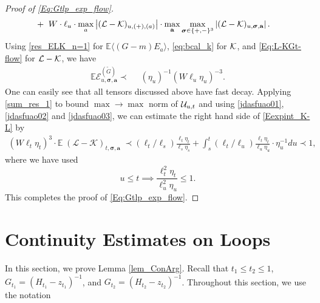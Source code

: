 \documentclass[10pt,reqno]{article}
\theoremstyle{plain} %
\theoremstyle{remark}
\numberwithin{equation}{section}
\begin{document}
\begin{proof}[Proof of \eqref{Eq:Gtlp_exp_flow}]
\begin{align}
 + \; \;& W\cdot\ell_u\cdot \max_a \left|({\cal L}-{\cal K})_{u,(+),(a)}\right|
 \cdot 
 \max_{\textbf{a}} \max_{ \boldsymbol{\sigma}\in \{+,-\}^3} \left|({\cal L}-{\cal K})_{u,\boldsymbol{\sigma},\textbf{a}}\right|.
 \end{align}
Using  \eqref{res_ELK_n=1} for $\mathbb E \langle (G-m) E_a\rangle$, \eqref{eq:bcal_k} for $\cal K$, 
and \eqref{Eq:L-KGt-flow} for $\cal L-\cal K$, we have   
 \begin{align} \label{jdasfuao03}
  \mathbb E \mathcal{E}^{(\widetilde{G})}_{u, \boldsymbol{\sigma},\textbf{a}} \prec \; \;& (\eta_u)^{-1} (W\ell_u\eta_u)^{-3}. 
 \end{align}
One can easily see that all tensors discussed above  have  fast decay. Applying \eqref{sum_res_1} to bound  $\max\to \max$ norm of ${\cal U}_{u,t}$ and using   \eqref{jdasfuao01}, \eqref{jdasfuao02} and \eqref{jdasfuao03}, we can estimate the right hand side  of  \eqref{Eexpint_K-L} by 
 \begin{align}
   (W\ell_t\eta_t)^{3}\cdot   \mathbb E\;    (\mathcal{L} - \mathcal{K})_{t, \boldsymbol{\sigma}, \textbf{a}} \;\prec 
 (\ell_t/\ell_s)\frac{\ell_t\eta_t}{\ell_s\eta_s}+
  \int_{s}^t(\ell_t/\ell_u)\frac{\ell_t\eta_t}{\ell_u\eta_u}\cdot \eta_u^{-1}
 du 
 \prec 1, 
\end{align}
where  we have used 
 $$
u\le t\implies\frac{\ell^2_t\eta_t}{\ell^2_u\eta_u}\le 1.
 $$
This  completes the proof of \eqref{Eq:Gtlp_exp_flow}. 
\end{proof}
            

\section{Continuity Estimates on Loops}\label{sec:Inh_LE}
In this section, we prove Lemma \ref{lem_ConArg}. Recall that $t_1\le t_2\le 1$, $G_{t_1}=(H_{t_1}-z_{t_1})^{-1}$, and $G_{t_2}=(H_{t_2}-z_{t_2})^{-1}$. Throughout this section, we use the notation
\end{document}
